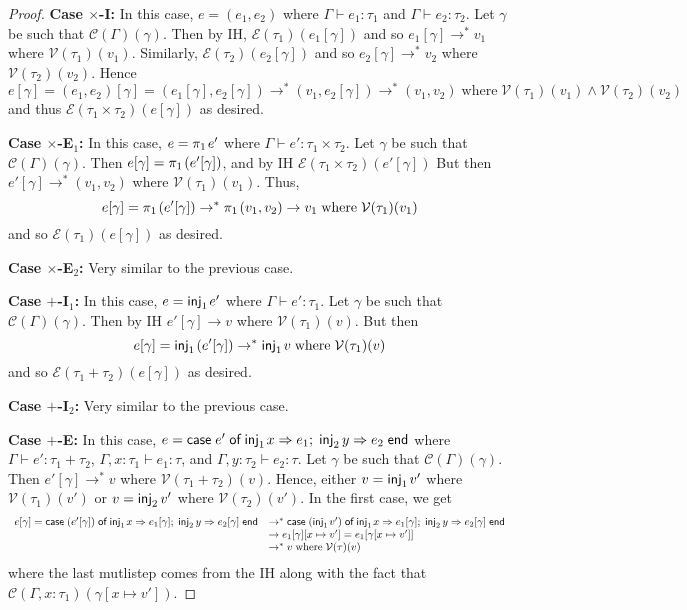 \documentclass{lecturenotes}
\newcommand{\projl}[1]{\ensuremath{\pi_1\mkern2mu#1}}
\newcommand{\sumtype}[2]{\ensuremath{#1 + #2}}
\newcommand{\injl}[1]{\ensuremath{\textsf{inj}_1\mkern2mu#1}}
\newcommand{\injr}[1]{\ensuremath{\textsf{inj}_2\mkern3mu#1}}
\newcommand{\case}[5]{\ensuremath{\textsf{case}\mkern5mu#1\mkern5mu\textsf{of}\mkern5mu\injl{#2} \Rightarrow #3;\mkern5mu\injr{#4} \Rightarrow #5\mkern5mu\textsf{end}}}
\begin{document}
\begin{proof}
  \noindent\textbf{Case \textsc{$\times$-I}:}
  In this case, $e = (e_1, e_2)$ where $\Gamma \vdash e_1 : \tau_1$ and $\Gamma \vdash e_2 : \tau_2$.
  Let $\gamma$ be such that $\mathcal{C}(\Gamma)(\gamma)$.
  Then by IH, $\mathcal{E}(\tau_1)(e_1[\gamma])$ and so $e_1[\gamma] \to^\ast v_1$ where $\mathcal{V}(\tau_1)(v_1)$.
  Similarly, $\mathcal{E}(\tau_2)(e_2[\gamma])$ and so $e_2[\gamma] \to^\ast v_2$ where $\mathcal{V}(\tau_2)(v_2)$.
  Hence $$e[\gamma] = (e_1, e_2)[\gamma] = (e_1[\gamma], e_2[\gamma]) \to^\ast (v_1, e_2[\gamma]) \to^\ast (v_1, v_2) \mathrel{\text{where}} \mathcal{V}(\tau_1)(v_1) \land \mathcal{V}(\tau_2)(v_2)$$
  and thus $\mathcal{E}(\tau_1 \times \tau_2)(e[\gamma])$ as desired.

  \noindent\textbf{Case \textsc{$\times$-E$_1$}:}
  In this case, $e = \projl{e'}$ where $\Gamma \vdash e' : \tau_1 \times \tau_2$.
  Let $\gamma$ be such that $\mathcal{C}(\Gamma)(\gamma)$.
  Then $e[\gamma] = \projl{(e'[\gamma])}$, and by IH $\mathcal{E}(\tau_1 \times \tau_2)(e'[\gamma])$
  But then $e'[\gamma] \to^\ast (v_1, v_2)$ where $\mathcal{V}(\tau_1)(v_1)$.
  Thus, $$e[\gamma] = \projl{(e'[\gamma])} \to^\ast \projl{(v_1, v_2)} \to v_1 \mathrel{\text{where}} \mathcal{V}(\tau_1)(v_1)$$
  and so $\mathcal{E}(\tau_1)(e[\gamma])$ as desired.

  \noindent\textbf{Case \textsc{$\times$-E$_2$}:}
  Very similar to the previous case.

  \noindent\textbf{Case \textsc{$+$-I$_1$}:}
  In this case, $e = \injl{e'}$ where $\Gamma \vdash e' : \tau_1$.
  Let $\gamma$ be such that $\mathcal{C}(\Gamma)(\gamma)$.
  Then by IH $e'[\gamma] \to v$ where $\mathcal{V}(\tau_1)(v)$.
  But then $$e[\gamma] = \injl{(e'[\gamma])} \to^\ast \injl{v} \mathrel{\text{where}} \mathcal{V}(\tau_1)(v)$$
  and so $\mathcal{E}(\sumtype{\tau_1}{\tau_2})(e[\gamma])$ as desired.

  \noindent\textbf{Case \textsc{$+$-I$_2$}:}
  Very similar to the previous case.

  \noindent\textbf{Case \textsc{$+$-E}:}
  In this case, $e = \case{e'}{x}{e_1}{y}{e_2}$ where $\Gamma \vdash e' : \sumtype{\tau_1}{\tau_2}$, $\Gamma, x : \tau_1 \vdash e_1 : \tau$, and $\Gamma, y : \tau_2 \vdash e_2 : \tau$.
  Let $\gamma$ be such that $\mathcal{C}(\Gamma)(\gamma)$.
  Then $e'[\gamma] \to^\ast v$ where $\mathcal{V}(\sumtype{\tau_1}{\tau_2})(v)$.
  Hence, either $v = \injl{v'}$ where $\mathcal{V}(\tau_1)(v')$ or $v =\injr{v'}$ where $\mathcal{V}(\tau_2)(v')$.
  In the first case, we get
  $$
  \begin{array}{ll}
    e[\gamma] = \case{(e'[\gamma])}{x}{e_1[\gamma]}{y}{e_2[\gamma]} &\to^\ast \case{(\injl{v'})}{x}{e_1[\gamma]}{y}{e_2[\gamma]}\\
                                                &\to e_1[\gamma][x \mapsto v'] = e_1[\gamma[x\mapsto v']]\\
                                                &\to^\ast v \mathrel{\text{where}} \mathcal{V}(\tau)(v)
  \end{array}
  $$
  where the last mutlistep comes from the IH along with the fact that $\mathcal{C}(\Gamma, x : \tau_1)(\gamma[x \mapsto v'])$.


\end{proof}
\end{document}
